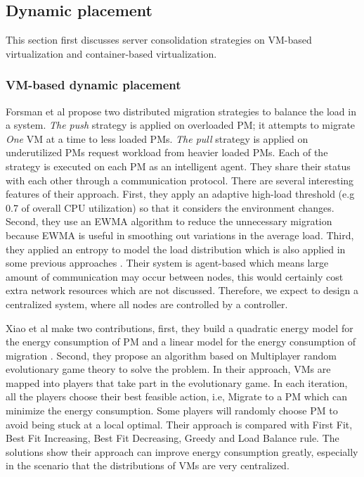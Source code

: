 \subsection{Dynamic placement}
This section first discusses server consolidation strategies on VM-based virtualization and container-based virtualization.

\subsubsection{VM-based dynamic placement}
\label{sec:dynamic}

Forsman et al \cite{Forsman:2015ca} propose two distributed migration strategies to balance the load in a system. \emph{The push} strategy is applied on overloaded PM; it attempts to migrate \emph{One} VM at a time to less loaded PMs. \emph{The pull} strategy is applied on underutilized PMs request workload from heavier loaded PMs. Each of the strategy is executed on each PM as an intelligent agent. They share their status with each other through a communication protocol. There are several interesting features of their approach. First, they apply an adaptive high-load threshold (e.g 0.7 of overall CPU utilization) so that it considers the environment changes. Second, they use an EWMA algorithm to reduce the unnecessary migration because EWMA \cite{Holt:2004fs} is useful in smoothing out variations in the average load. Third, they applied an entropy to model the load distribution which is also applied in some previous approaches \cite{Qin:2012wu,Kunkle:2008bz}. Their system is agent-based which means large amount of communication may occur between nodes, this would certainly cost extra network resources which are not discussed. Therefore, we expect to design a centralized system, where all nodes are controlled by a controller. 

Xiao et al \cite{Xiao:2015ik} make two contributions, first, they build a quadratic energy model for the energy consumption of PM and a linear model for the energy consumption of migration \cite{Liu:2013kl}. Second, they propose an algorithm based on Multiplayer random evolutionary game theory to solve the problem. In their approach, VMs are mapped into players that take part in the evolutionary game. In each iteration, all the players choose their best feasible action, i.e, Migrate to a PM which can minimize the energy consumption. Some players will randomly choose PM to avoid being stuck at a local optimal. Their approach is compared with First Fit, Best Fit Increasing, Best Fit Decreasing, Greedy and Load Balance rule. The solutions show their approach can improve energy consumption greatly, especially in the scenario that the distributions of VMs are very centralized.

